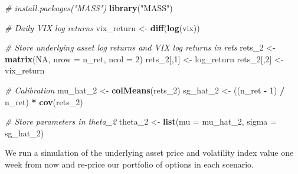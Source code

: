 \documentclass[]{article}
\newenvironment{Shaded}{\begin{snugshade}}{\end{snugshade}}
\newcommand{\CommentTok}[1]{\textcolor[rgb]{0.56,0.35,0.01}{\textit{#1}}}
\newcommand{\DataTypeTok}[1]{\textcolor[rgb]{0.13,0.29,0.53}{#1}}
\newcommand{\DecValTok}[1]{\textcolor[rgb]{0.00,0.00,0.81}{#1}}
\newcommand{\KeywordTok}[1]{\textcolor[rgb]{0.13,0.29,0.53}{\textbf{#1}}}
\newcommand{\NormalTok}[1]{#1}
\newcommand{\OperatorTok}[1]{\textcolor[rgb]{0.81,0.36,0.00}{\textbf{#1}}}
\newcommand{\OtherTok}[1]{\textcolor[rgb]{0.56,0.35,0.01}{#1}}
\newcommand{\StringTok}[1]{\textcolor[rgb]{0.31,0.60,0.02}{#1}}
\begin{document}
\begin{Shaded}
\begin{Highlighting}[]
\CommentTok{\# install.packages("MASS")}
\KeywordTok{library}\NormalTok{(}\StringTok{"MASS"}\NormalTok{)}

\CommentTok{\# Daily VIX log returns}
\NormalTok{vix\_return <{-}}\StringTok{ }\KeywordTok{diff}\NormalTok{(}\KeywordTok{log}\NormalTok{(vix))}

\CommentTok{\# Store underlying asset log returns and VIX log returns in \textquotesingle{}rets\textquotesingle{}}
\NormalTok{rets\_}\DecValTok{2}\NormalTok{     <{-}}\StringTok{ }\KeywordTok{matrix}\NormalTok{(}\OtherTok{NA}\NormalTok{, }\DataTypeTok{nrow =}\NormalTok{ n\_ret, }\DataTypeTok{ncol =} \DecValTok{2}\NormalTok{)}
\NormalTok{rets\_}\DecValTok{2}\NormalTok{[,}\DecValTok{1}\NormalTok{] <{-}}\StringTok{ }\NormalTok{log\_return}
\NormalTok{rets\_}\DecValTok{2}\NormalTok{[,}\DecValTok{2}\NormalTok{] <{-}}\StringTok{ }\NormalTok{vix\_return}

\CommentTok{\# Calibration}
\NormalTok{mu\_hat\_}\DecValTok{2}\NormalTok{ <{-}}\StringTok{ }\KeywordTok{colMeans}\NormalTok{(rets\_}\DecValTok{2}\NormalTok{)}
\NormalTok{sg\_hat\_}\DecValTok{2}\NormalTok{ <{-}}\StringTok{ }\NormalTok{((n\_ret }\OperatorTok{{-}}\StringTok{ }\DecValTok{1}\NormalTok{) }\OperatorTok{/}\StringTok{ }\NormalTok{n\_ret) }\OperatorTok{*}\StringTok{ }\KeywordTok{cov}\NormalTok{(rets\_}\DecValTok{2}\NormalTok{)}

\CommentTok{\# Store parameters in \textquotesingle{}theta\_2\textquotesingle{}}
\NormalTok{theta\_}\DecValTok{2}\NormalTok{ <{-}}\StringTok{ }\KeywordTok{list}\NormalTok{(}\DataTypeTok{mu =}\NormalTok{ mu\_hat\_}\DecValTok{2}\NormalTok{, }\DataTypeTok{sigma =}\NormalTok{ sg\_hat\_}\DecValTok{2}\NormalTok{)}
\end{Highlighting}
\end{Shaded}

We run a simulation of the underlying asset price and volatility index
value one week from now and re-price our portfolio of options in each
scenario.
\end{document}
